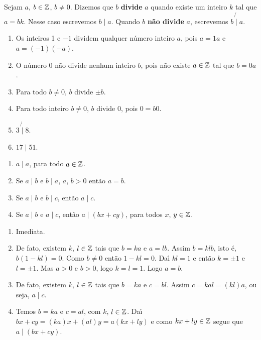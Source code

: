 \begin{definicao}
	Sejam $a$, $b \in \mathbb{Z}$, $b \neq 0$. Dizemos que $b$ \textbf{divide} $a$ quando existe um inteiro $k$ tal que $a=bk$.
	Nesse caso escrevemos $b \mid a$. Quando $b$ \textbf{n{\~a}o divide} $a$, escrevemos $b\not{\mid}a$.
\end{definicao}

\begin{exemplos}
	\begin{enumerate}[label={\arabic*})]
		\item Os inteiros 1 e $-1$ dividem qualquer n{\'u}mero inteiro $a$, pois $a = 1 a$ e $a = (-1)(-a)$.
		\item O n{\'u}mero 0 n{\~a}o divide nenhum inteiro $b$, pois n{\~a}o existe $a \in \mathbb{Z}$ tal que $b = 0a$.
		\item Para todo $b\neq 0$, $b$ divide $\pm b$.
		\item Para todo inteiro $b\neq 0$, $b$ divide 0, pois $0 = b0$.
		\item $3 \not{\mid} 8$.
		\item $17 \mid 51$.
	\end{enumerate}	
\end{exemplos}


\begin{proposicao}
	\begin{enumerate}[label={\roman*})]
		\item $a\mid a$, para todo $a \in \mathbb{Z}$.
		\item Se $a\mid b$ e $b\mid a$, $a$, $b > 0$ ent\~ao $a = b$.
		\item Se $a\mid b$ e $b\mid c$, ent{\~a}o $a\mid c$.
		\item Se $a\mid b$ e $a\mid c$, ent{\~a}o $a\mid (bx+cy)$, para todos $x$, $y \in \mathbb{Z}$.
	\end{enumerate}
\end{proposicao}
\begin{prova}
	\begin{enumerate}[label={\roman*})]
		\item Imediata.
		
		\item De fato, existem $k$, $l \in \mathbb{Z} $ tais que $b = ka$ e $a = lb$. Assim $b = klb$, isto \'e, $b(1 - kl) = 0$.
		Como $b \ne 0$ ent\~ao $1 - kl = 0$. Da{\'\i} $kl = 1$ e ent\~ao $k = \pm 1$ e $l = \pm 1$. Mas $a > 0$ e $b > 0$, logo $k = l =1$. Logo $a = b$.

		\item De fato, existem $k$, $l \in \mathbb{Z}$ tais que $b = ka$ e $c = bl$. Assim  $c = kal = (kl)a$, ou seja, $a\mid c$.

		\item Temos $b = ka$ e $c = al$, com $k$, $l \in \mathbb{Z}$. Da{\'\i} $bx + cy = (ka)x + (al)y = a(kx + ly)$ e como $kx + ly \in \mathbb{Z}$ segue que $a \mid (bx + cy)$.
	\end{enumerate}
\end{prova}

